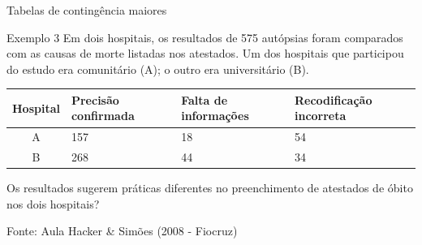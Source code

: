 \documentclass{beamer}
\begin{document}




\begin{frame}{\scriptsize Tabelas de contingência maiores}
  \begin{exampleblock}{Exemplo 3}
    \scriptsize
    Em dois hospitais, os resultados de 575 autópsias
    foram comparados com as causas de morte listadas nos
    atestados. Um dos hospitais que participou do estudo era
    comunitário (A); o outro era universitário (B).

    \bigskip
    \begin{tabular}{c|p{2cm}|p{2cm}|p{2cm}}
      Hospital & Precisão confirmada & Falta de informações &
      Recodificação incorreta \\
      \hline
      A & 157 & 18 & 54 \\
      \hline
      B & 268 & 44 & 34 \\
    \end{tabular}

    \bigskip
    Os resultados sugerem práticas diferentes no preenchimento de
    atestados de óbito nos dois hospitais?
  \end{exampleblock}
  \vfill
  {\hfill \tiny Fonte: Aula Hacker \& Simões (2008 - Fiocruz)}
\end{frame}
\end{document}
